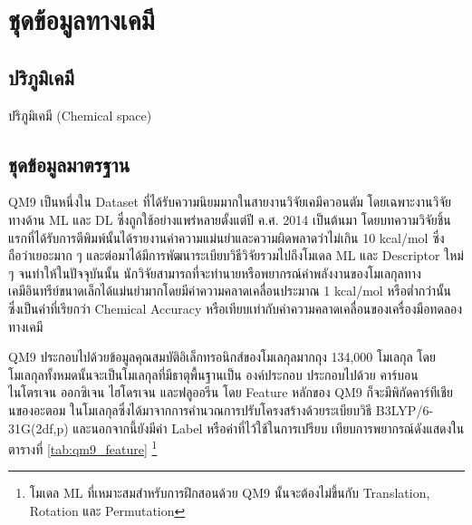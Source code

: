 

\chapter{ชุดข้อมูลทางเคมี}
\label{ch:dataset}

\section{ปริภูมิเคมี}

ปริภูมิเคมี (Chemical space) 

\section{ชุดข้อมูลมาตรฐาน}

QM9 เป็นหนึ่งใน Dataset ที่ได้รับความนิยมมากในสายงานวิจัยเคมีควอนตัม โดยเฉพาะงานวิจัยทางด้าน ML และ DL ซึ่งถูกใช้อย่างแพร่หลายตั้งแต่ปี
ค.ศ. 2014 เป็นต้นมา\cite{ramakrishnan2014} โดยบทความวิจัยชิ้นแรกที่ได้รับการตีพิมพ์นั้นได้รายงานค่าความแม่นยำและความผิดพลาดว่าไม่เกิน 
10 kcal/mol ซึ่งถือว่าเยอะมาก ๆ และต่อมาได้มีการพัฒนาระเบียบวิธีวิจัยรวมไปถึงโมเดล ML และ Descriptor ใหม่ ๆ จนทำให้ในปัจจุบันนั้น%
นักวิจัยสามารถที่จะทำนายหรือพยากรณ์ค่าพลังงานของโมเลกุลทางเคมีอินทรีย์ขนาดเล็กได้แม่นยำมากโดยมีค่าความคลาดเคลื่อนประมาณ 1 kcal/mol 
หรือต่ำกว่านั้น ซึ่งเป็นค่าที่เรียกว่า Chemical Accuracy หรือเทียบเท่ากับค่าความคลาดเคลื่อนของเครื่องมือทดลองทางเคมี

QM9 ประกอบไปด้วยข้อมูลคุณสมบัติอิเล็กทรอนิกส์ของโมเลกุลมากถุง 134,000 โมเลกุล โดยโมเลกุลทั้งหมดนั้นจะเป็นโมเลกุลที่มีธาตุพื้นฐานเป็น%
องค์ประกอบ ประกอบไปด้วย คาร์บอน ไนโตรเจน ออกซิเจน ไฮโดรเจน และฟลูออรีน โดย Feature หลักของ QM9 ก็จะมีพิกัดคาร์ทีเชียนของอะตอม%
ในโมเลกุลซึ่งได้มาจากการคำนวณการปรับโครงสร้างด้วยระเบียบวิธี B3LYP/6-31G(2df,p) และนอกจากนี้ยังมีค่า Label หรือค่าที่ไว้ใช้ในการเปรียบ%
เทียบการพยากรณ์ดังแสดงในตารางที่ \ref{tab:qm9_feature}
\footnote{โมเดล ML ที่เหมาะสมสำหรับการฝึกสอนด้วย QM9 นั้นจะต้องไม่ขึ้นกับ Translation, Rotation และ Permutation}

